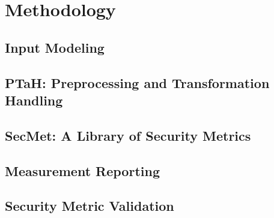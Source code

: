 \section{Methodology}\label{sec_methodology}

% 


\subsection{Input Modeling} \label{sec:methodology:input_modeling}


\subsection{PTaH: Preprocessing and Transformation Handling} \label{sec:methodology:ptah_arch}


\subsection{SecMet: A Library of Security Metrics}\label{sec:methodology:dev_env}



\subsection{Measurement Reporting}\label{sec:methodology:reporting}



% 

\subsection{Security Metric Validation}\label{sec:methodology:validation}

